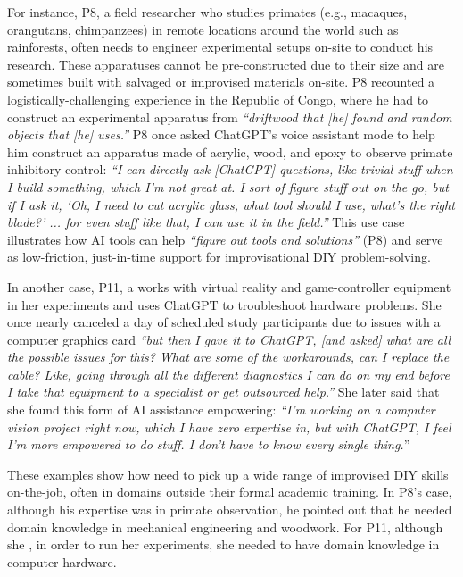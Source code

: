 For instance, P8, a field researcher who studies primates (e.g., macaques, orangutans, chimpanzees) in remote locations around the world such as rainforests, often needs to engineer experimental setups on-site to conduct his research. These apparatuses cannot be pre-constructed due to their size and are sometimes built with salvaged or improvised materials on-site. P8 recounted a logistically-challenging experience in the Republic of Congo, where he had to construct an experimental apparatus from \textit{``driftwood that [he] found and random objects that [he] uses.''} P8 once asked ChatGPT’s voice assistant mode to help him construct an apparatus made of acrylic, wood, and epoxy to observe primate inhibitory control: \textit{``I can directly ask [ChatGPT] questions, like trivial stuff when I build something, which I'm not great at. I sort of figure stuff out on the go, but if I ask it, `Oh, I need to cut acrylic glass, what tool should I use, what's the right blade?' ... for even stuff like that, I can use it in the field.''} This use case illustrates how AI tools can help  \textit{``figure out tools and solutions''} (P8) and serve as low-friction, just-in-time support for improvisational DIY problem-solving.

In another case, P11, a  works with virtual reality and game-controller equipment in her experiments and uses ChatGPT to troubleshoot hardware problems. She once nearly canceled a day of scheduled study participants due to issues with a computer graphics card \textit{``but then I gave it to ChatGPT, [and asked] what are all the possible issues for this? What are some of the workarounds, can I replace the cable? Like, going through all the different diagnostics I can do on my end before I take that equipment to a specialist or get outsourced help.''} She later said that she found this form of AI assistance empowering: \textit{``I'm working on a computer vision project right now, which I have zero expertise in, but with ChatGPT, I feel I'm more empowered to do stuff. I don't have to know every single thing.}''

These examples show how  need to pick up a wide range of improvised DIY skills on-the-job, often in domains outside their formal academic training. In P8's case, although his expertise was in primate observation, he pointed out that he needed domain knowledge in mechanical engineering and woodwork. For P11, although she , in order to run her experiments, she needed to have domain knowledge in computer hardware.